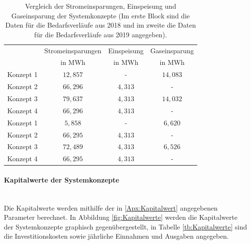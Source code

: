 \begin{table}[htb]
		\centering
		\caption{Vergleich der Stromeinsparungen, Einspeisung und Gaseinsparung der Systemkonzepte (Im erste Block sind die Daten für die Bedarfsverläufe aus 2018 und im zweite die Daten für die Bedarfsverläufe aus 2019 angegeben).}
		\begin{tabular}{l c c c}
		\toprule 
		& Stromeinsparungen & Einspeisung & Gaseinsparung
		\\
	    & in MWh & in MWh & in MWh\\
		\midrule
		Konzept 1 & $12,857$ &    -    & $14,083$\\
		Konzept 2 & $66,296$ & $4,313$ &    -    \\
		Konzept 3 & $79,637$ & $4,313$ & $14,032$\\
		Konzept 4 & $66,296$ & $4,313$ &    -    \\
		\midrule
		Konzept 1 & $5,858$  &    -    & $6,620$\\
		Konzept 2 & $66,295$ & $4,313$ &    -   \\
		Konzept 3 & $72,489$ & $4,313$ & $6,526$\\
		Konzept 4 & $66,295$ & $4,313$ &    -   \\
		\bottomrule
		\end{tabular}
		\label{tb:ErgebnisseSim}
\end{table}	
\FloatBarrier

\paragraph{Kapitalwerte der Systemkonzepte}\ \\
Die Kapitalwerte werden mithilfe der in \ref{Apx:Kapitalwert} angegebenen Parameter berechnet. In Abbildung \ref{fig:Kapitalwerte} werden die Kapitalwerte der Systemkonzepte graphisch gegenübergestellt, in Tabelle \ref{tb:Kapitalwerte} sind die Investitionskosten sowie jährliche Einnahmen und Ausgaben angegeben.\\

